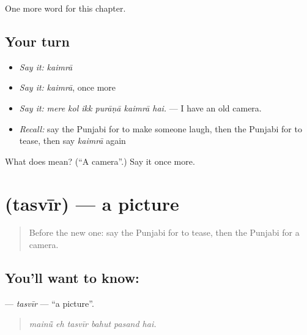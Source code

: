 \begin{grammarlens}[title={What you've built}]
One more word for this chapter.
\end{grammarlens}

\subsection*{Your turn}
\begin{itemize}
\raggedright
  \item \emph{Say it:} \emph{kaimrā}
  \item \emph{Say it:} \emph{kaimrā}, once more
  \item \emph{Say it:} \emph{mere kol ikk purāṇā kaimrā hai.} — I have an old camera.
  \item \emph{Recall:} say the Punjabi for to make someone laugh, then the Punjabi for to tease, then say \emph{kaimrā} again
\end{itemize}

\begin{tcolorbox}[breakable,colback=teal!4,colframe=teal!35!black,title={Before you move on}]
What does  mean? (\textquotedblleft{}A camera\textquotedblright{}.) Say it once more.
\end{tcolorbox}
\section[\texorpdfstring{\pa{ਤਸਵੀਰ} (tasvīr)}{ਤਸਵੀਰ (tasvīr)}]{ (tasvīr) — a picture}

\label{lesson:PA-C356-tasvir}



\begin{quote}
Before the new one: say the Punjabi for to tease, then the Punjabi for a camera.
\end{quote}

\subsection*{You'll want to know: }
\textbf{} — \emph{tasvīr} — \textquotedblleft{}a picture\textquotedblright{}.

\begin{quote}
     
\end{quote}

\begin{quote}
\emph{mainū̃ eh tasvīr bahut pasand hai.}
\end{quote}

